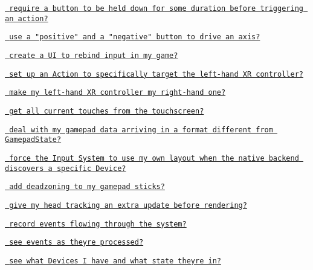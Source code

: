 \begin{DoxyItemize}
\item \href{Interactions.html\#hold}{\texttt{ require a button to be held down for some duration before triggering an action?}}
\item \href{ActionBindings.html\#1d-axis}{\texttt{ use a "{}positive"{} and a "{}negative"{} button to drive an axis?}}
\item \href{../api/UnityEngine.InputSystem.InputActionRebindingExtensions.html}{\texttt{ create a UI to rebind input in my game?}}
\item \href{../api/UnityEngine.InputSystem.XR.XRController.html\#UnityEngine_InputSystem_XR_XRController_leftHand}{\texttt{ set up an Action to specifically target the left-\/hand XR controller?}}
\item \href{../api/UnityEngine.InputSystem.XR.XRController.html\#UnityEngine_InputSystem_XR_XRController_leftHand}{\texttt{ make my left-\/hand XR controller my right-\/hand one?}}
\item \href{Touch.md\#reading-all-touches}{\texttt{ get all current touches from the touchscreen?}}
\item \href{../api/UnityEngine.InputSystem.LowLevel.GamepadState.html}{\texttt{ deal with my gamepad data arriving in a format different from {\ttfamily Gamepad\+State}?}}
\item \href{Devices.md\#native-devices}{\texttt{ force the Input System to use my own layout when the native backend discovers a specific Device?}}
\item \href{Gamepad.md\#deadzones}{\texttt{ add deadzoning to my gamepad sticks?}}
\item \href{../api/UnityEngine.InputSystem.XR.XRHMD.html}{\texttt{ give my head tracking an extra update before rendering?}}
\item \href{Debugging.md\#other-tips}{\texttt{ record events flowing through the system?}}
\item \href{Debugging.md\#other-tips}{\texttt{ see events as they\textquotesingle{}re processed?}}
\item \href{Debugging.html\#debugging-devices}{\texttt{ see what Devices I have and what state they\textquotesingle{}re in?}} 
\end{DoxyItemize}